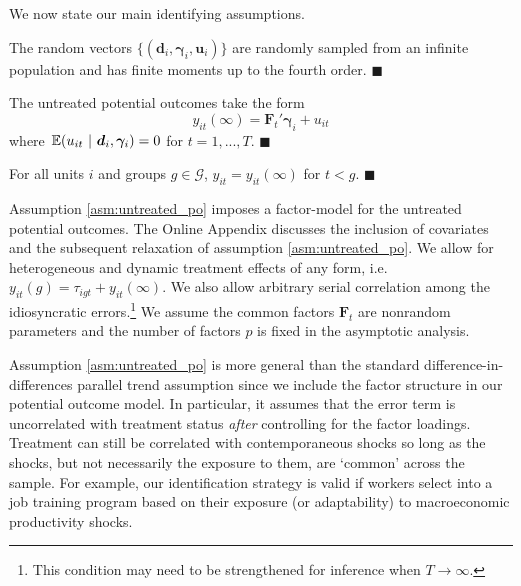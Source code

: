 \documentclass[12pt]{article}
\begin{document}
We now state our main identifying assumptions.
\begin{assumption}\label{asm:sampling}
The random vectors $\{ (\bm d_i, \bm \gamma_i, \bm u_i) \}$ are randomly sampled from an infinite population and has finite moments up to the fourth order. $\blacksquare$
\end{assumption}

\begin{assumption}\label{asm:untreated_po}
The untreated potential outcomes take the form
\begin{equation*}
  y_{it}(\infty) = \bm{F}_t' \bm \gamma_i + u_{it}
\end{equation*}
where $\expec{u_{it}}{\bm d_i, \bm \gamma_i} = 0$ for $t = 1,...,T$. $\blacksquare$
\end{assumption}

\begin{assumption}\label{asm:no_anticipation}
For all units $i$ and groups $g \in \mathcal{G}$, $y_{it} = y_{it}(\infty)$ for $t < g$. $\blacksquare$ %
\end{assumption}

Assumption \ref{asm:untreated_po} imposes a factor-model for the untreated potential outcomes. The Online Appendix discusses the inclusion of covariates and the subsequent relaxation of assumption \ref{asm:untreated_po}. We allow for heterogeneous and dynamic treatment effects of any form, i.e. $y_{it}(g) = \tau_{igt} + y_{it}(\infty)$. We also allow arbitrary serial correlation among the idiosyncratic errors.\footnote{This condition may need to be strengthened for inference when $T \rightarrow \infty$.} We assume the common factors $\bm{F}_t$ are nonrandom parameters and the number of factors $p$ is fixed in the asymptotic analysis. 

Assumption \ref{asm:untreated_po} is more general than the standard difference-in-differences parallel trend assumption since we include the factor structure in our potential outcome model. In particular, it assumes that the error term is uncorrelated with treatment status \emph{after} controlling for the factor loadings. Treatment can still be correlated with contemporaneous shocks so long as the shocks, but not necessarily the exposure to them, are `common' across the sample. For example, our identification strategy is valid if workers select into a job training program based on their exposure (or adaptability) to macroeconomic productivity shocks. 
\end{document}
